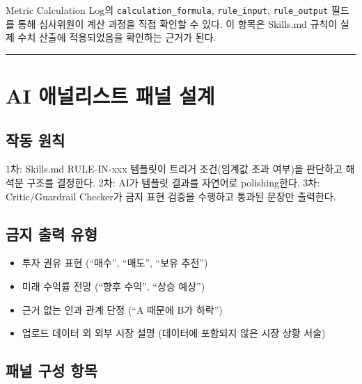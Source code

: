 \documentclass[10pt,a4paper]{article}
\providecommand{\tightlist}{\setlength{\itemsep}{0pt}\setlength{\parskip}{0pt}}
\begin{document}
Metric Calculation Log의 \texttt{calculation\_formula}, \texttt{rule\_input}, \texttt{rule\_output} 필드를 통해 심사위원이 계산 과정을 직접 확인할 수 있다. 이 항목은 Skills.md 규칙이 실제 수치 산출에 적용되었음을 확인하는 근거가 된다.

\begin{center}\rule{0.5\linewidth}{0.5pt}\end{center}

\section{AI 애널리스트 패널 설계}\label{ai-uxc560uxb110uxb9acuxc2a4uxd2b8-uxd328uxb110-uxc124uxacc4}

\subsection{작동 원칙}\label{uxc791uxb3d9-uxc6d0uxce59}

1차: Skills.md RULE-IN-xxx 템플릿이 트리거 조건(임계값 초과 여부)을 판단하고 해석문 구조를 결정한다.
2차: AI가 템플릿 결과를 자연어로 polishing한다.
3차: Critic/Guardrail Checker가 금지 표현 검증을 수행하고 통과된 문장만 출력한다.

\subsection{금지 출력 유형}\label{uxae08uxc9c0-uxcd9cuxb825-uxc720uxd615}

\begin{itemize}
\tightlist
\item
  투자 권유 표현 (``매수'', ``매도'', ``보유 추천'')
\item
  미래 수익률 전망 (``향후 수익'', ``상승 예상'')
\item
  근거 없는 인과 관계 단정 (``A 때문에 B가 하락'')
\item
  업로드 데이터 외 외부 시장 설명 (데이터에 포함되지 않은 시장 상황 서술)
\end{itemize}

\subsection{패널 구성 항목}\label{uxd328uxb110-uxad6cuxc131-uxd56duxbaa9}
\end{document}
